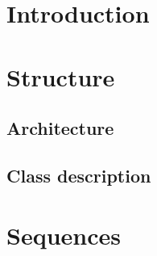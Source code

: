 \documentclass[a4paper,10pt]{scrartcl}
\title{\doctitle}
\author{\authorName}
\date{\today}
\begin{document}

\tableofcontents
\clearpage

\section{Introduction}

\section{Structure}
\subsection{Architecture}
\subsection{Class description}

\section{Sequences}

%
\end{document}
